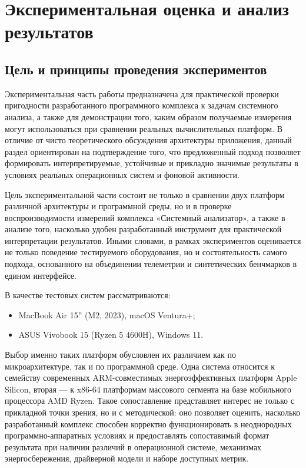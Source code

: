 \chapter{Экспериментальная оценка и анализ результатов}
\label{ch:experiments}

\section{Цель и принципы проведения экспериментов}

Экспериментальная часть работы предназначена для практической проверки пригодности разработанного программного комплекса к задачам системного анализа, а также для демонстрации того, каким образом получаемые измерения могут использоваться при сравнении реальных вычислительных платформ. В отличие от чисто теоретического обсуждения архитектуры приложения, данный раздел ориентирован на подтверждение того, что предложенный подход позволяет формировать интерпретируемые, устойчивые и прикладно значимые результаты в условиях реальных операционных систем и фоновой активности.

Цель экспериментальной части состоит не только в сравнении двух платформ различной архитектуры и программной среды, но и в проверке воспроизводимости измерений комплекса «Системный анализатор», а также в анализе того, насколько удобен разработанный инструмент для практической интерпретации результатов. Иными словами, в рамках экспериментов оценивается не только поведение тестируемого оборудования, но и состоятельность самого подхода, основанного на объединении телеметрии и синтетических бенчмарков в едином интерфейсе.

В качестве тестовых систем рассматриваются:
\begin{itemize}
    \item MacBook Air 15'' (M2, 2023), macOS Ventura+;
    \item ASUS Vivobook 15 (Ryzen 5 4600H), Windows 11.
\end{itemize}

Выбор именно таких платформ обусловлен их различием как по микроархитектуре, так и по программной среде. Одна система относится к семейству современных ARM-совместимых энергоэффективных платформ Apple Silicon, вторая --- к x86-64 платформам массового сегмента на базе мобильного процессора AMD Ryzen. Такое сопоставление представляет интерес не только с прикладной точки зрения, но и с методической: оно позволяет оценить, насколько разработанный комплекс способен корректно функционировать в неоднородных программно-аппаратных условиях и предоставлять сопоставимый формат результата при наличии различий в операционной системе, механизмах энергосбережения, драйверной модели и наборе доступных метрик.

